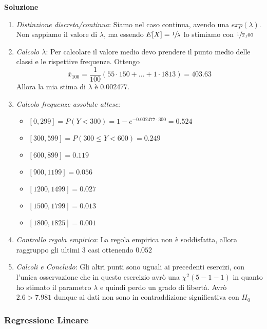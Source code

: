 \ind \textbf{Soluzione}
\begin{enumerate}
    \item \textit{Distinzione discreta/continua}: Siamo nel caso continua, avendo una $exp(\lambda)$. Non sappiamo il valore di $\lambda$, ma essendo $E[X] = \sfrac{1}{\lambda}$ lo stimiamo con $\sfrac{1}{\overline{x}_100}$
    \item \textit{Calcolo $\lambda$}: Per calcolare il valore medio devo prendere il punto medio delle classi e le rispettive frequenze. Ottengo $$\overline{x}_100 = \frac{1}{100}(55 \cdot 150 + ... + 1 \cdot 1813) = 403.63 $$ Allora la mia stima di $\lambda$ è 0.002477. 
    \item \textit{Calcolo frequenze assolute attese}: 
    \begin{itemize}
        \item $[0,299] = P( Y < 300) = 1 - e^{-0.002477 \cdot 300} = 0.524 $
        \item $[300, 599] = P(300 \leq Y < 600) = 0.249 $
        \item $[600, 899] = 0.119$ 
        \item $[900, 1199] = 0.056$
        \item $[1200, 1499] = 0.027$ 
        \item $[1500, 1799] = 0.013$ 
        \item $[1800, 1825] = 0.001$ 
    \end{itemize}
    \item \textit{Controllo regola empirica}: La regola empirica non è soddisfatta, allora raggruppo gli ultimi 3 casi ottenendo $0.052$
    \item \textit{Calcoli e Concludo}: Gli altri punti sono uguali ai precedenti esercizi, con l'unica osservazione che in questo esercizio avrò una $\chi^2(5-1-1)$ in quanto ho stimato il parametro $\lambda$ e quindi perdo un grado di libertà. Avrò $2.6 > 7.981$ dunque ai dati non sono in contraddizione significativa con $H_0$
\end{enumerate}

\subsubsection{Regressione Lineare}

